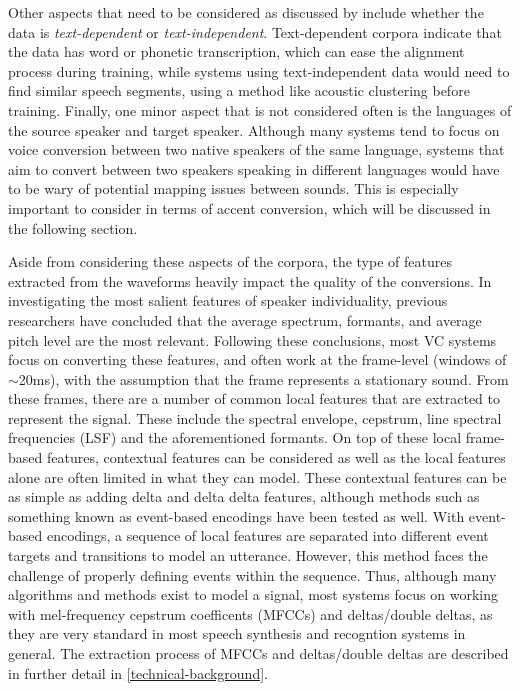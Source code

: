 \documentclass
[
    a4paper,
    twoside,
    12pt,
]
{report}
\begin{document}
Other aspects that need to be considered as discussed by
\textcite{mohammadi2017} include whether the data is
\emph{text-dependent} or \emph{text-independent}. Text-dependent corpora
indicate that the data has word or phonetic transcription, which can
ease the alignment process during training, while systems using
text-independent data would need to find similar speech segments, using
a method like acoustic clustering before training. Finally, one minor
aspect that is not considered often is the languages of the source
speaker and target speaker. Although many systems tend to focus on voice
conversion between two native speakers of the same language, systems
that aim to convert between two speakers speaking in different languages
would have to be wary of potential mapping issues between sounds. This
is especially important to consider in terms of accent conversion, which
will be discussed in the following section.

Aside from considering these aspects of the corpora, the type of
features extracted from the waveforms heavily impact the quality of the
conversions. In investigating the most salient features of speaker
individuality, previous researchers have concluded that the average
spectrum, formants, and average pitch level are the most relevant.
Following these conclusions, most VC systems focus on converting these
features, and often work at the frame-level (windows of
\begin{math}\sim\end{math}20ms), with the assumption that the frame
represents a stationary sound. From these frames, there are a number of
common local features that are extracted to represent the signal. These
include the spectral envelope, cepstrum, line spectral frequencies (LSF)
and the aforementioned formants. On top of these local frame-based
features, contextual features can be considered as well as the local
features alone are often limited in what they can model. These
contextual features can be as simple as adding delta and delta delta
features, although methods such as something known as event-based
encodings have been tested as well. With event-based encodings, a
sequence of local features are separated into different event targets
and transitions to model an utterance. However, this method faces the
challenge of properly defining events within the sequence. Thus,
although many algorithms and methods exist to model a signal, most
systems focus on working with mel-frequency cepstrum coefficents (MFCCs)
and deltas/double deltas, as they are very standard in most speech
synthesis and recogntion systems in general. The extraction process of
MFCCs and deltas/double deltas are described in further detail in
\autoref{technical-background}.
\end{document}
